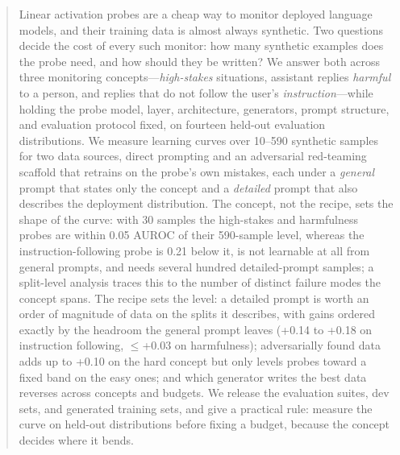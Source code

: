 \begin{abstract}
Linear activation probes are a cheap way to monitor deployed language models,
and their training data is almost always synthetic. Two questions decide the
cost of every such monitor: how many synthetic examples does the probe need,
and how should they be written? We answer both across three monitoring
concepts---\emph{high-stakes} situations, assistant replies \emph{harmful} to a
person, and replies that do not follow the user's \emph{instruction}---while
holding the probe model, layer, architecture, generators, prompt structure, and
evaluation protocol fixed, on fourteen held-out evaluation distributions. We
measure learning curves over 10--590 synthetic samples for two data sources,
direct prompting and an adversarial red-teaming scaffold that retrains on the
probe's own mistakes, each under a \emph{general} prompt that states only the
concept and a \emph{detailed} prompt that also describes the deployment
distribution. The concept, not the recipe, sets the shape of the curve: with
30 samples the high-stakes and harmfulness probes are within 0.05 AUROC of
their 590-sample level, whereas the instruction-following probe is 0.21 below
it, is not learnable at all from general prompts, and needs several hundred
detailed-prompt samples; a split-level analysis traces this to the number of
distinct failure modes the concept spans. The recipe sets the level: a
detailed prompt is worth an order of magnitude of data on the splits it
describes, with gains ordered exactly by the headroom the general prompt
leaves (+0.14 to +0.18 on instruction following, $\le$+0.03 on harmfulness);
adversarially found data adds up to +0.10 on the hard concept but only
levels probes toward a fixed band on the easy ones; and which generator
writes the best data reverses across concepts and budgets. We release the
evaluation suites, dev sets, and generated training sets, and give a
practical rule: measure the curve on held-out distributions before fixing a
budget, because the concept decides where it bends.
\end{abstract}

